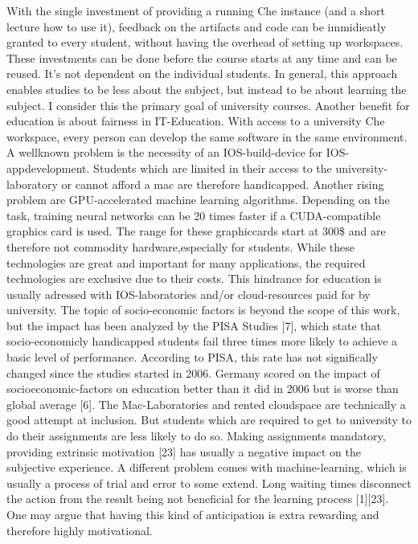 \documentclass[utf8,biblatex]{lni}
\begin{document}
With the single investment of providing a running Che instance (and a short lecture how to use it), feedback on the artifacts and code can be immidieatly granted to every student, without having the overhead of setting up workspaces. 
These investments can be done before the course starts at any time and can be reused.
It's not dependent on the individual students. 
In general, this approach enables studies to be less about the subject, but instead to be about learning the subject. 
I consider this the primary goal of university courses. 
Another benefit for education is about fairness in IT-Education.  
With access to a university Che workspace, every person can develop the same software in the same environment. 
A wellknown problem is the necessity of an IOS-build-device for IOS-appdevelopment.
Students which are limited in their access to the university-laboratory or cannot afford a mac are therefore handicapped.
Another  rising  problem  are  GPU-accelerated  machine learning algorithms. 
Depending on the task, training neural networks can be 20 times faster if a CUDA-compatible graphics card is used. 
The range for these graphiccards start at 300\$ and are therefore not commodity hardware,especially for students.  
While these technologies are great and important for many applications, the required technologies are exclusive due to  their  costs.
This  hindrance  for  education  is  usually adressed  with  IOS-laboratories  and/or  cloud-resources paid for by university. 
The topic of socio-economic factors is beyond the scope of this work, but the impact has been analyzed by the PISA Studies [7], which state that socio-economicly handicapped students fail three times more likely to achieve a basic level of performance.
According to PISA, this rate has not significally changed since the studies started in 2006. 
Germany scored on the impact of socioeconomic-factors on education better than it did in 2006 but is worse than global average [6].
The Mac-Laboratories and rented cloudspace are technically a good attempt at inclusion. 
But students which are required to get to university to do their assignments are 
less  likely  to  do  so.
Making  assignments  mandatory, providing extrinsic motivation [23] has usually a negative impact on the subjective experience.
A different problem comes with machine-learning, which is usually a process of trial and error to some extend.
Long waiting times disconnect the action from the result being not beneficial for the learning process [1][23]. 
One may argue that having this kind of anticipation is extra rewarding and therefore highly motivational.
\end{document}
